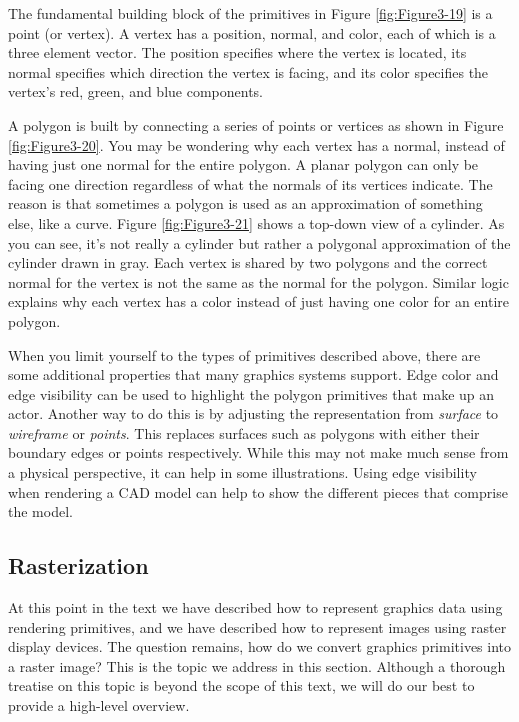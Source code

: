 The fundamental building block of the primitives in Figure \ref{fig:Figure3-19} is a point (or vertex). A vertex has a position, normal, and color, each of which is a three element vector. The position specifies where the vertex is located, its normal specifies which direction the vertex is facing, and its color specifies the vertex's red, green, and blue components.

A polygon is built by connecting a series of points or vertices as shown in Figure \ref{fig:Figure3-20}. You may be wondering why each vertex has a normal, instead of having just one normal for the entire polygon. A planar polygon can only be facing one direction regardless of what the normals of its vertices indicate. The reason is that sometimes a polygon is used as an approximation of something else, like a curve. Figure \ref{fig:Figure3-21} shows a top-down view of a cylinder. As you can see, it's not really a cylinder but rather a polygonal approximation of the cylinder drawn in gray. Each vertex is shared by two polygons and the correct normal for the vertex is not the same as the normal for the polygon. Similar logic explains why each vertex has a color instead of just having one color for an entire polygon.

When you limit yourself to the types of primitives described above, there are some additional properties that many graphics systems support. Edge color and edge visibility can be used to highlight the polygon primitives that make up an actor. Another way to do this is by adjusting the representation from \emph{surface} to \emph{wireframe} or \emph{points}. This replaces surfaces such as polygons with either their boundary edges or points respectively. While this may not make much sense from a physical perspective, it can help in some illustrations. Using edge visibility when rendering a CAD model can help to show the different pieces that comprise the model.

\subsection{Rasterization}

At this point in the text we have described how to represent graphics data using rendering primitives, and we have described how to represent images using raster display devices. The question remains, how do we convert graphics primitives into a raster image? This is the topic we address in this section. Although a thorough treatise on this topic is beyond the scope of this text, we will do our best to provide a high-level overview.

